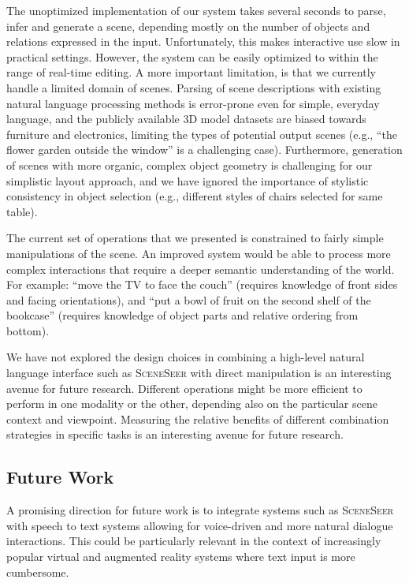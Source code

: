 \documentclass{sigchi}
\newcommand{\SceneSeer}{\textsc{SceneSeer}\xspace}
\begin{document}
The unoptimized implementation of our system takes several seconds to parse, infer and generate a scene, depending mostly on the number of objects and relations expressed in the input.  Unfortunately, this makes interactive use slow in practical settings.  However, the system can be easily optimized to within the range of real-time editing.  A more important limitation, is that we currently handle a limited domain of scenes.  Parsing of scene descriptions with existing natural language processing methods is error-prone even for simple, everyday language, and the publicly available 3D model datasets are biased towards furniture and electronics, limiting the types of potential output scenes (e.g., ``the flower garden outside the window'' is a challenging case).  Furthermore, generation of scenes with more organic, complex object geometry is challenging for our simplistic layout approach, and we have ignored the importance of stylistic consistency in object selection (e.g., different styles of chairs selected for same table).

The current set of operations that we presented is constrained to fairly simple manipulations of the scene.  An improved system would be able to process more complex interactions that require a deeper semantic understanding of the world.  For example: ``move the TV to face the couch'' (requires knowledge of front sides and facing orientations), and ``put a bowl of fruit on the second shelf of the bookcase'' (requires knowledge of object parts and relative ordering from bottom).

We have not explored the design choices in combining a high-level natural language interface such as \SceneSeer with direct manipulation is an interesting avenue for future research.  Different operations might be more efficient to perform in one modality or the other, depending also on the particular scene context and viewpoint.  Measuring the relative benefits of different combination strategies in specific tasks is an interesting avenue for future research.
\vspace{-.1em}

\subsection{Future Work}

A promising direction for future work is to integrate systems such as \SceneSeer with speech to text systems allowing for voice-driven and more natural dialogue interactions.  This could be particularly relevant in the context of increasingly popular virtual and augmented reality systems where text input is more cumbersome.
\end{document}
